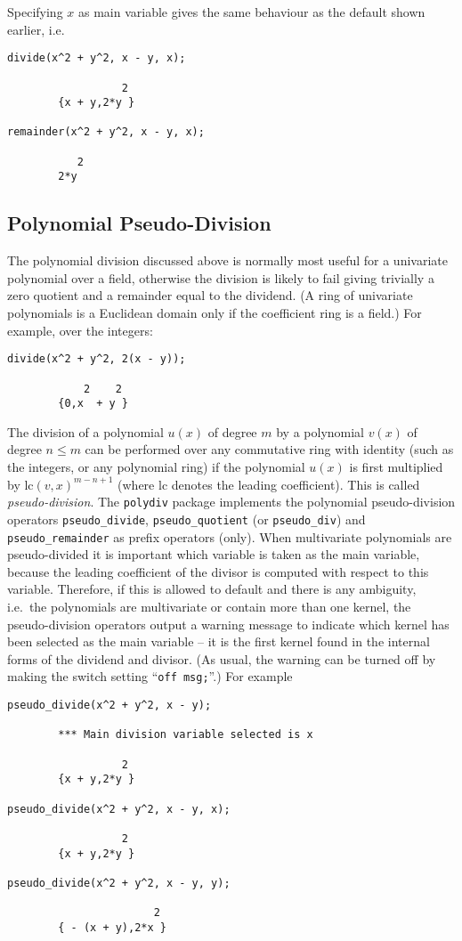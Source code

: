 Specifying $x$ as main variable gives the same behaviour as the
default shown earlier, i.e.
\begin{verbatim}
divide(x^2 + y^2, x - y, x);

                  2
        {x + y,2*y }

remainder(x^2 + y^2, x - y, x);

           2
        2*y
\end{verbatim}


\subsection{Polynomial Pseudo-Division}

The polynomial division discussed above is normally most useful for a
univariate polynomial over a field, otherwise the division is likely
to fail giving trivially a zero quotient and a remainder equal to the
dividend.  (A ring of univariate polynomials is a Euclidean domain
only if the coefficient ring is a field.)  For example, over the
integers:
\begin{verbatim}
divide(x^2 + y^2, 2(x - y));

            2    2
        {0,x  + y }
\end{verbatim}

The division of a polynomial $u(x)$ of degree $m$ by a polynomial
$v(x)$ of degree $n \le m$ can be performed over any commutative ring
with identity (such as the integers, or any polynomial ring) if the
polynomial $u(x)$ is first multiplied by $\mathrm{lc}(v,x)^{m-n+1}$
(where lc denotes the leading coefficient).  This is called
\emph{pseudo-division}.  The \texttt{polydiv} package implements the
polynomial pseudo-division operators \texttt{pseudo\_divide},
\texttt{pseudo\_quotient} (or \texttt{pseudo\_div}) and
\texttt{pseudo\_remainder} as prefix operators (only).  When
multivariate polynomials are pseudo-divided it is important which
variable is taken as the main variable, because the leading
coefficient of the divisor is computed with respect to this variable.
Therefore, if this is allowed to default and there is any ambiguity,
i.e.\ the polynomials are multivariate or contain more than one
kernel, the pseudo-division operators output a warning message to
indicate which kernel has been selected as the main variable -- it is
the first kernel found in the internal forms of the dividend and
divisor.  (As usual, the warning can be turned off by making the
switch setting ``\texttt{off msg;}''.)  For example
\begin{verbatim}
pseudo_divide(x^2 + y^2, x - y);

        *** Main division variable selected is x 

                  2
        {x + y,2*y }

pseudo_divide(x^2 + y^2, x - y, x);

                  2
        {x + y,2*y }

pseudo_divide(x^2 + y^2, x - y, y);

                       2
        { - (x + y),2*x }
\end{verbatim}

